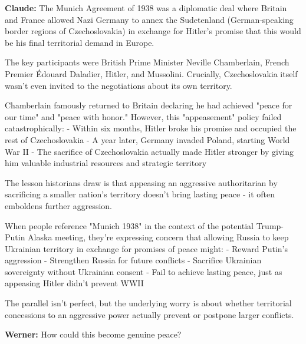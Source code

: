\documentclass[11pt,a5paper]{scrartcl}
\begin{document}
\begin{claudebox}
\textbf{Claude:} The Munich Agreement of 1938 was a diplomatic deal where Britain and France allowed Nazi Germany to annex the Sudetenland (German-speaking border regions of Czechoslovakia) in exchange for Hitler's promise that this would be his final territorial demand in Europe.

The key participants were British Prime Minister Neville Chamberlain, French Premier Édouard Daladier, Hitler, and Mussolini. Crucially, Czechoslovakia itself wasn't even invited to the negotiations about its own territory.

Chamberlain famously returned to Britain declaring he had achieved "peace for our time" and "peace with honor." However, this "appeasement" policy failed catastrophically:
- Within six months, Hitler broke his promise and occupied the rest of Czechoslovakia
- A year later, Germany invaded Poland, starting World War II
- The sacrifice of Czechoslovakia actually made Hitler stronger by giving him valuable industrial resources and strategic territory

The lesson historians draw is that appeasing an aggressive authoritarian by sacrificing a smaller nation's territory doesn't bring lasting peace - it often emboldens further aggression.

When people reference "Munich 1938" in the context of the potential Trump-Putin Alaska meeting, they're expressing concern that allowing Russia to keep Ukrainian territory in exchange for promises of peace might:
- Reward Putin's aggression
- Strengthen Russia for future conflicts
- Sacrifice Ukrainian sovereignty without Ukrainian consent
- Fail to achieve lasting peace, just as appeasing Hitler didn't prevent WWII

The parallel isn't perfect, but the underlying worry is about whether territorial concessions to an aggressive power actually prevent or postpone larger conflicts.
\end{claudebox}

\begin{humanbox}
\textbf{Werner:} How could this become genuine peace?
\end{humanbox}
\end{document}

